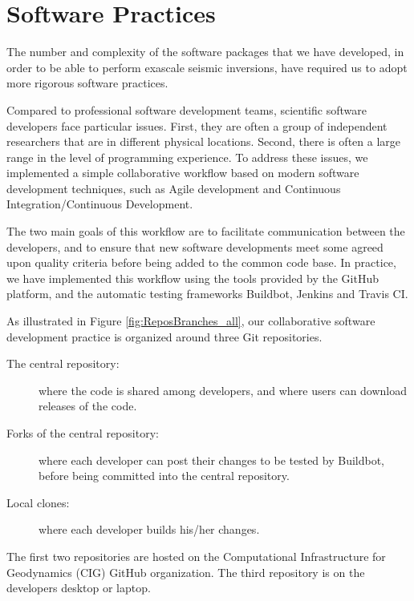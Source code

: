 
\section{Software Practices}
\label{sec:software_practices}

The number and complexity of the software packages that we have developed, in order to be able
to perform exascale seismic inversions, have required us to adopt more rigorous
software practices.

Compared to professional software development teams, scientific software
developers face particular issues.
First, they are often a group of independent researchers that are in different
physical locations.
Second, there is often a large range in the level of programming
experience.
To address these issues, we implemented a simple
collaborative workflow based on modern software development techniques, such as
Agile
development and Continuous Integration/Continuous Development.

The two main goals of this workflow are to facilitate communication between
the developers, and to ensure that new software developments meet some agreed
upon quality criteria before being added to the common code base.
In practice, we have implemented this workflow using the tools provided by the
GitHub platform, and the automatic testing frameworks Buildbot, Jenkins and Travis CI.

As illustrated in Figure \ref{fig:ReposBranches_all}, our collaborative
software development practice
is organized around three Git repositories.
\begin{description}
\item[The central repository:] where the code is shared among developers, and
where users can download releases of the code.
\item[Forks of the central repository:] where each developer can post their
changes to
be tested by Buildbot, before being committed into the central
repository.
\item[Local clones:] where each developer builds his/her changes.
\end{description}
The first two repositories are hosted on the Computational Infrastructure for
Geodynamics (CIG) GitHub organization. The third repository is on the
developers desktop or laptop.



